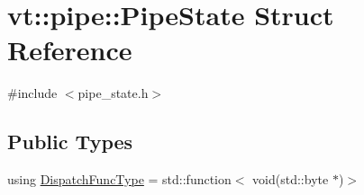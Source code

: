 \hypertarget{structvt_1_1pipe_1_1_pipe_state}{}\section{vt\+:\+:pipe\+:\+:Pipe\+State Struct Reference}
\label{structvt_1_1pipe_1_1_pipe_state}


{\ttfamily \#include $<$pipe\+\_\+state.\+h$>$}

\subsection*{Public Types}
\begin{DoxyCompactItemize}
\item 
using \hyperlink{structvt_1_1pipe_1_1_pipe_state_aa6d3f6b8d9c1a4d1f261bc563ff99e3e}{Dispatch\+Func\+Type} = std\+::function$<$ void(std\+::byte $\ast$)$>$
\end{DoxyCompactItemize}

